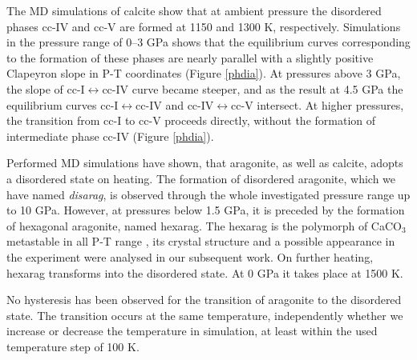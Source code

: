 \documentclass[journal=jacsat,manuscript=article]{achemso}
\begin{document}
The MD simulations of calcite show that at ambient pressure the disordered phases cc-IV and cc-V are formed at 1150 and 1300 K, respectively. 
Simulations in the pressure range of 0--3 GPa shows that the equilibrium curves corresponding to the formation of these phases are nearly parallel with a slightly positive Clapeyron slope in P-T coordinates (Figure \ref{phdia}). 
At pressures above 3 GPa, the slope of cc-I$\leftrightarrow$cc-IV curve became steeper, and as the result at 4.5 GPa the equilibrium curves cc-I$\leftrightarrow$cc-IV and cc-IV$\leftrightarrow$cc-V intersect.
At higher pressures, the transition from cc-I to cc-V proceeds directly, without the formation of intermediate phase cc-IV (Figure \ref{phdia}). 

Performed MD simulations have shown, that aragonite, as well as calcite, adopts a disordered state on heating. 
The formation of disordered aragonite, which we have named {\it disarag}, is observed through the whole investigated pressure range up to 10 GPa. 
However, at pressures below 1.5 GPa, it is preceded by the formation of hexagonal aragonite, named hexarag. 
The hexarag is the polymorph of CaCO$_3$ metastable in all P-T range \cite{kawano2009}, its crystal structure and a possible appearance in the experiment were analysed in our subsequent work. 
On further heating, hexarag transforms into the disordered state.
At 0 GPa it takes place at 1500 K.

No hysteresis has been observed for the transition of aragonite to the disordered state. 
The transition occurs at the same temperature, independently whether we increase or decrease the temperature in simulation, at least within the used temperature step of 100 K.
\end{document}
